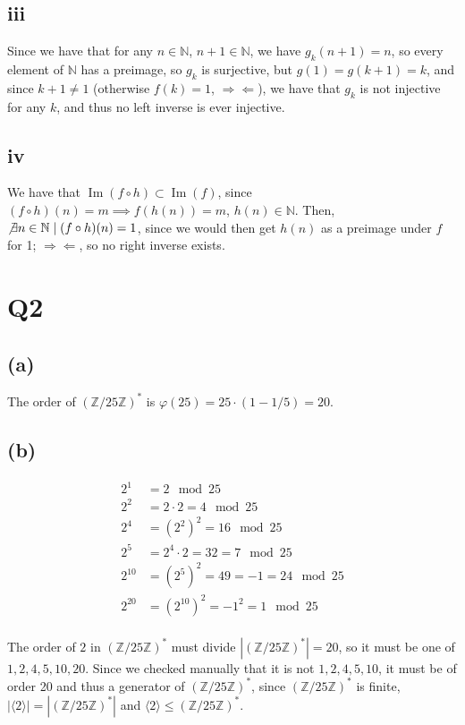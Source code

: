 \documentclass[12pt,letterpaper]{article}
\theoremstyle{definition}
\newcommand{\contra}{\Rightarrow\!\Leftarrow}
\newcommand{\Z}{\mathbb{Z}}
\newcommand{\N}{\mathbb{N}}
\DeclareMathOperator{\Image}{Im}
\begin{document}
\subsection*{iii}

Since we have that for any $n \in \N$, $n + 1 \in \N$, we have $g_{k}(n + 1) = n$, so every element of $\N$ has a preimage, so $g_{k}$ is surjective, but $g(1) = g(k + 1) = k$, and since $k + 1 \neq 1$ (otherwise $f(k) = 1$, $\contra$), we have that $g_{k}$ is not injective for any $k$, and thus no left inverse is ever injective.

\subsection*{iv}

We have that $\Image(f \circ h) \subset \Image(f)$, since $(f \circ h)(n) = m \implies f(h(n)) = m$, $h(n) \in \N$. Then, $\not\exists n \in \N \mid (f \circ h)(n) = 1$, since we would then get $h(n)$ as a preimage under $f$ for 1; $\contra$, so no right inverse exists.

\section*{Q2}

\subsection*{(a)}

The order of $(\Z/25\Z)^{*}$ is $\varphi(25) = 25 \cdot (1 - 1/5) = 20$.

\subsection*{(b)}

\begin{align*}
  2^{1} &= 2  \mod 25\\
  2^{2} &= 2 \cdot 2 = 4  \mod 25\\
  2^{4} &= (2^{2})^{2} = 16  \mod 25\\
  2^{5} &= 2^{4} \cdot 2 = 32 = 7 \mod 25 \\
  2^{10} &= (2^{5})^{2} = 49 = -1 = 24 \mod 25 \\
  2^{20} &= (2^{10})^{2} = -1^{2} = 1 \mod 25 \\
\end{align*}

The order of $2$ in $(\Z/25\Z)^{*}$ must divide $|(\Z/25\Z)^{*}| = 20$, so it must be one of $1,2,4,5,10,20$. Since we checked manually that it is not $1,2,4,5,10$, it must be of order 20 and thus a generator of $(\Z/25\Z)^{*}$, since $(\Z/25\Z)^{*}$ is finite, $|\langle 2 \rangle| = |(\Z/25\Z)^{*}|$ and $\langle 2 \rangle \leq (\Z/25\Z)^{*}$.
\end{document}
